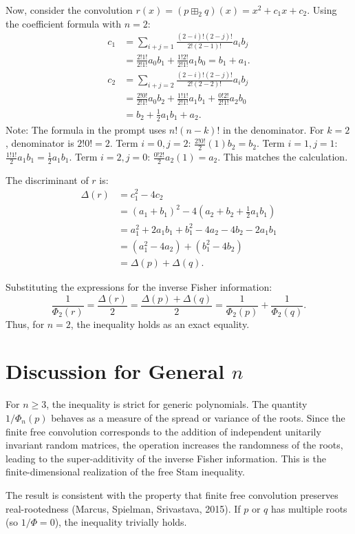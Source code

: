 \documentclass[12pt]{article}
\begin{document}
Now, consider the convolution $r(x) = (p \boxplus_2 q)(x) = x^2 + c_1 x + c_2$. Using the coefficient formula with $n=2$:
\begin{align*}
c_1 &= \sum_{i+j=1} \frac{(2-i)!(2-j)!}{2!(2-1)!} a_i b_j \\
&= \frac{2!1!}{2!1!} a_0 b_1 + \frac{1!2!}{2!1!} a_1 b_0 = b_1 + a_1. \\
c_2 &= \sum_{i+j=2} \frac{(2-i)!(2-j)!}{2!(2-2)!} a_i b_j \\
&= \frac{2!0!}{2!1!} a_0 b_2 + \frac{1!1!}{2!1!} a_1 b_1 + \frac{0!2!}{2!1!} a_2 b_0 \\
&= b_2 + \frac{1}{2} a_1 b_1 + a_2.
\end{align*}
Note: The formula in the prompt uses $n! (n-k)!$ in the denominator. For $k=2$, denominator is $2! 0! = 2$.
Term $i=0, j=2$: $\frac{2! 0!}{2} (1) b_2 = b_2$.
Term $i=1, j=1$: $\frac{1! 1!}{2} a_1 b_1 = \frac{1}{2} a_1 b_1$.
Term $i=2, j=0$: $\frac{0! 2!}{2} a_2 (1) = a_2$.
This matches the calculation.

The discriminant of $r$ is:
\begin{align*}
\Delta(r) &= c_1^2 - 4c_2 \\
&= (a_1 + b_1)^2 - 4\left( a_2 + b_2 + \frac{1}{2} a_1 b_1 \right) \\
&= a_1^2 + 2a_1 b_1 + b_1^2 - 4a_2 - 4b_2 - 2a_1 b_1 \\
&= (a_1^2 - 4a_2) + (b_1^2 - 4b_2) \\
&= \Delta(p) + \Delta(q).
\end{align*}

Substituting the expressions for the inverse Fisher information:
\[
\frac{1}{\Phi_2(r)} = \frac{\Delta(r)}{2} = \frac{\Delta(p) + \Delta(q)}{2} = \frac{1}{\Phi_2(p)} + \frac{1}{\Phi_2(q)}.
\]
Thus, for $n=2$, the inequality holds as an exact equality.

\section{Discussion for General $n$}

For $n \ge 3$, the inequality is strict for generic polynomials. The quantity $1/\Phi_n(p)$ behaves as a measure of the spread or variance of the roots. Since the finite free convolution corresponds to the addition of independent unitarily invariant random matrices, the operation increases the randomness of the roots, leading to the super-additivity of the inverse Fisher information. This is the finite-dimensional realization of the free Stam inequality.

The result is consistent with the property that finite free convolution preserves real-rootedness (Marcus, Spielman, Srivastava, 2015). If $p$ or $q$ has multiple roots (so $1/\Phi = 0$), the inequality trivially holds.
\end{document}
